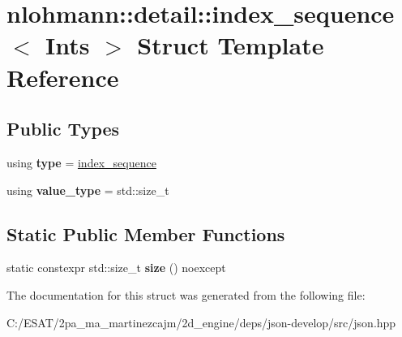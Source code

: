 \hypertarget{structnlohmann_1_1detail_1_1index__sequence}{}\section{nlohmann\+:\+:detail\+:\+:index\+\_\+sequence$<$ Ints $>$ Struct Template Reference}
\label{structnlohmann_1_1detail_1_1index__sequence}
\subsection*{Public Types}
\begin{DoxyCompactItemize}
\item 
\mbox{\label{structnlohmann_1_1detail_1_1index__sequence_a3c14c4ab277de72b166806193ff4fa10}} 
using {\bfseries type} = \hyperlink{structnlohmann_1_1detail_1_1index__sequence}{index\+\_\+sequence}
\item 
\mbox{\label{structnlohmann_1_1detail_1_1index__sequence_a2eca43d08fc1eb68bd5fa75b6714d21d}} 
using {\bfseries value\+\_\+type} = std\+::size\+\_\+t
\end{DoxyCompactItemize}
\subsection*{Static Public Member Functions}
\begin{DoxyCompactItemize}
\item 
\mbox{\label{structnlohmann_1_1detail_1_1index__sequence_a7ac529419787d775f52408135304b337}} 
static constexpr std\+::size\+\_\+t {\bfseries size} () noexcept
\end{DoxyCompactItemize}


The documentation for this struct was generated from the following file\+:\begin{DoxyCompactItemize}
\item 
C\+:/\+E\+S\+A\+T/2pa\+\_\+ma\+\_\+martinezcajm/2d\+\_\+engine/deps/json-\/develop/src/json.\+hpp\end{DoxyCompactItemize}
